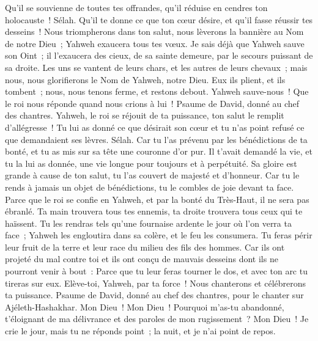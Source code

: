 \begin{multicols}{2}
Qu'il se souvienne de toutes tes offrandes, qu'il réduise en cendres ton holocauste~! Sélah.
Qu'il te donne ce que ton cœur désire, et qu'il fasse réussir tes desseins~!
Nous triompherons dans ton salut, nous lèverons la bannière au Nom de notre Dieu~; Yahweh exaucera tous tes vœux.
Je sais déjà que Yahweh sauve son Oint~; il l'exaucera des cieux, de sa sainte demeure, par le secours puissant de sa droite.
Les uns se vantent de leurs chars, et les autres de leurs chevaux~; mais nous, nous glorifierons le Nom de Yahweh, notre Dieu.
Eux ils plient, et ils tombent~; nous, nous tenons ferme, et restons debout.
Yahweh sauve-nous~! Que le roi nous réponde quand nous crions à lui~!
\VerseOne{}Psaume de David, donné au chef des chantres.
Yahweh, le roi se réjouit de ta puissance, ton salut le remplit d'allégresse~!
Tu lui as donné ce que désirait son cœur et tu n'as point refusé ce que demandaient ses lèvres. Sélah.
Car tu l'as prévenu par les bénédictions de ta bonté, et tu as mis sur sa tête une couronne d'or pur.
Il t'avait demandé la vie, et tu la lui as donnée, une vie longue pour toujours et à perpétuité.
Sa gloire est grande à cause de ton salut, tu l'as couvert de majesté et d'honneur.
Car tu le rends à jamais un objet de bénédictions, tu le combles de joie devant ta face.
Parce que le roi se confie en Yahweh, et par la bonté du Très-Haut, il ne sera pas ébranlé.
Ta main trouvera tous tes ennemis, ta droite trouvera tous ceux qui te haïssent.
Tu les rendras tels qu'une fournaise ardente le jour où l'on verra ta face~; Yahweh les engloutira dans sa colère, et le feu les consumera.
Tu feras périr leur fruit de la terre et leur race du milieu des fils des hommes.
Car ils ont projeté du mal contre toi et ils ont conçu de mauvais desseins dont ils ne pourront venir à bout~:
Parce que tu leur feras tourner le dos, et avec ton arc tu tireras sur eux.
Elève-toi, Yahweh, par ta force~! Nous chanterons et célébrerons ta puissance.
\VerseOne{}Psaume de David, donné au chef des chantres, pour le chanter sur Ajéleth-Hashakhar.
Mon Dieu~! Mon Dieu~! Pourquoi m'as-tu abandonné, t'éloignant de ma délivrance et des paroles de mon rugissement~?
Mon Dieu~! Je crie le jour, mais tu ne réponds point~; la nuit, et je n'ai point de repos.

\end{multicols}
